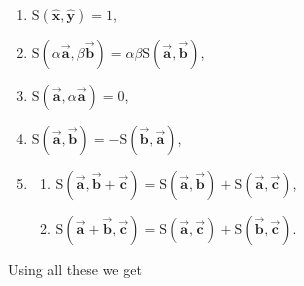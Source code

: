 \documentclass{article}
\newcommand{\vvec}[1]{\vec{\mathbf{#1}}}
\newcommand{\area}[2]{\mathrm{S}\left(#1,#2\right)}
\begin{document}
\begin{enumerate}
    \item $\area{\hat{\mathbf{x}}}{\hat{\mathbf{y}}} = 1$,
    \item $\area{\alpha\vvec{a}}{\beta\vvec{b}} = \alpha\beta\area{\vvec{a}}{\vvec{b}}$,
    \item $\area{\vvec{a}}{\alpha\vvec{a}} = 0$,
    \item $\area{\vvec{a}}{\vvec{b}} = -\area{\vvec{b}}{\vvec{a}}$,
    \item 
        \begin{enumerate}
            \item $\area{\vvec{a}}{\vvec{b}+\vvec{c}} = \area{\vvec{a}}{\vvec{b}} + \area{\vvec{a}}{\vvec{c}}$,
            \item $\area{\vvec{a}+\vvec{b}}{\vvec{c}} = \area{\vvec{a}}{\vvec{c}} + \area{\vvec{b}}{\vvec{c}}$.
        \end{enumerate}
\end{enumerate}

Using all these we get
\end{document}
